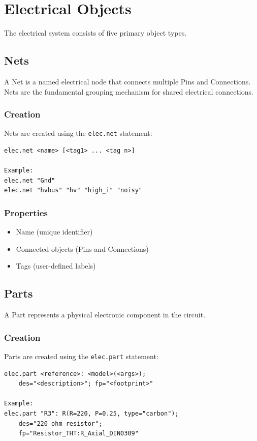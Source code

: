 \documentclass{report}
\begin{document}
\chapter{Electrical Objects}
The electrical system consists of five primary object types.

\section{Nets}
A Net is a named electrical node that connects multiple Pins and Connections. Nets are the fundamental grouping mechanism for shared electrical connections.

\subsection{Creation}
Nets are created using the \texttt{elec.net} statement:
\begin{verbatim}
elec.net <name> [<tag1> ... <tag n>]

Example:
elec.net "Gnd"
elec.net "hvbus" "hv" "high_i" "noisy"
\end{verbatim}

\subsection{Properties}
\begin{itemize}
\item Name (unique identifier)
\item Connected objects (Pins and Connections)
\item Tags (user-defined labels)
\end{itemize}

\section{Parts}
A Part represents a physical electronic component in the circuit.

\subsection{Creation}
Parts are created using the \texttt{elec.part} statement:
\begin{verbatim}
elec.part <reference>: <model>(<args>); 
    des="<description>"; fp="<footprint>"

Example:
elec.part "R3": R(R=220, P=0.25, type="carbon"); 
    des="220 ohm resistor"; 
    fp="Resistor_THT:R_Axial_DIN0309"
\end{verbatim}
\end{document}
